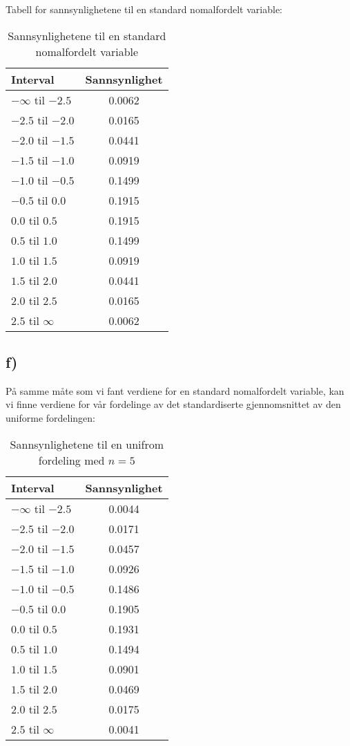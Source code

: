 \documentclass[a4paper,norsk, 10pt]{article}
\begin{document}
Tabell for sannsynlighetene til en standard nomalfordelt variable:\\

\begin{table}[H]
\centering
\begin{tabular}{|l|c|}
\hline
Interval & Sannsynlighet\\
\hline
$- \infty$ til $-2.5$ & 0.0062\\
$- 2.5$ til $-2.0$ & 0.0165\\
$- 2.0$ til $-1.5$ & 0.0441\\
$- 1.5$ til $-1.0$ & 0.0919\\
$- 1.0$ til $-0.5$ & 0.1499\\
$- 0.5$ til $0.0$ & 0.1915\\

$ 0.0$ til $0.5$ & 0.1915\\
$ 0.5$ til $1.0$ & 0.1499\\
$ 1.0$ til $1.5$ & 0.0919\\
$ 1.5$ til $2.0$ & 0.0441\\
$ 2.0$ til $2.5$ & 0.0165\\
$ 2.5$ til $\infty$ & 0.0062\\ \hline
\end{tabular}
\caption{Sannsynlighetene til en standard nomalfordelt variable}
\label{tab:stand}
\end{table}


\subsection*{f)}

På samme måte som vi fant verdiene for en standard nomalfordelt variable, kan vi finne verdiene for vår fordelinge av det standardiserte gjennomsnittet av den uniforme fordelingen:

\begin{table}[H]
\centering
\begin{tabular}{|l|c|}
\hline
Interval & Sannsynlighet\\
\hline
$- \infty$ til $-2.5$ & 0.0044\\
$- 2.5$ til $-2.0$ & 0.0171\\
$- 2.0$ til $-1.5$ & 0.0457\\
$- 1.5$ til $-1.0$ & 0.0926\\
$- 1.0$ til $-0.5$ & 0.1486\\
$- 0.5$ til $0.0$ & 0.1905\\

$ 0.0$ til $0.5$ & 0.1931\\
$ 0.5$ til $1.0$ & 0.1494\\
$ 1.0$ til $1.5$ & 0.0901\\
$ 1.5$ til $2.0$ & 0.0469\\
$ 2.0$ til $2.5$ & 0.0175\\
$ 2.5$ til $\infty$ & 0.0041\\ \hline
\end{tabular}
\caption{Sannsynlighetene til en unifrom fordeling med $n = 5$}
\label{tab:uniform5}
\end{table}
\end{document}
